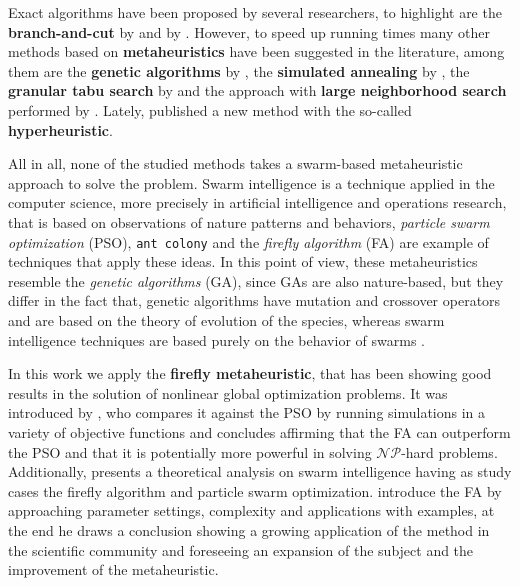 \documentclass[tuberlin,cic,tc,openright,english,noabntcite,oneside]{iiufrgs}
\begin{document}
Exact algorithms have been proposed by several researchers, to highlight are the \textbf{branch-and-cut} by \textcite{cordeau_branch-and-cut_2006} and by \textcite{ropke_models_2007}. However, to speed up running times many other methods based on \textbf{metaheuristics} have been suggested in the literature, among them are the \textbf{genetic algorithms} by \textcite{jorgensen_solving_2007}, the \textbf{simulated annealing} by \cite{zidi_multi-objective_2012}, the \textbf{granular tabu search} by \textcite{kirchler_granular_2013} and the approach with \textbf{large neighborhood search} performed by \textcite{parragh_hybrid_2013}. Lately, \cite{urra_hyperheuristic_2015} published a new method with the so-called \textbf{hyperheuristic}.

All in all, none of the studied methods takes a swarm-based metaheuristic approach to solve the problem. Swarm intelligence is a technique applied in the computer science, more precisely in artificial intelligence and operations research, that is based on observations of nature patterns and behaviors, \emph{particle swarm optimization} (PSO), \texttt{ant colony} and the \emph{firefly algorithm} (FA) are example of techniques that apply these ideas. In this point of view, these metaheuristics resemble the \emph{genetic algorithms} (GA), since GAs are also nature-based, but they differ in the fact that, genetic algorithms have mutation and crossover operators and are based on the theory of evolution of the species, whereas swarm intelligence techniques are based purely on the behavior of swarms \parencite[p. 189-190]{yang_efficiency_2012}.

In this work we apply the \textbf{firefly metaheuristic}, that has been showing good results in the solution of nonlinear global optimization problems. It was introduced by \textcite{yang_firefly_2009}, who compares it against the PSO by running simulations in a variety of objective functions and concludes affirming that the FA can outperform the PSO and that it is potentially more powerful in solving $\mathcal{NP}$-hard problems. Additionally, \textcite{yang_efficiency_2012} presents a theoretical analysis on swarm intelligence having as study cases the firefly algorithm and particle swarm optimization. \textcite{yang_firefly_2013} introduce the FA by approaching parameter settings, complexity and applications with examples, at the end he draws a conclusion showing a growing application of the method in the scientific community and foreseeing an expansion of the subject and the improvement of the metaheuristic.
\end{document}
